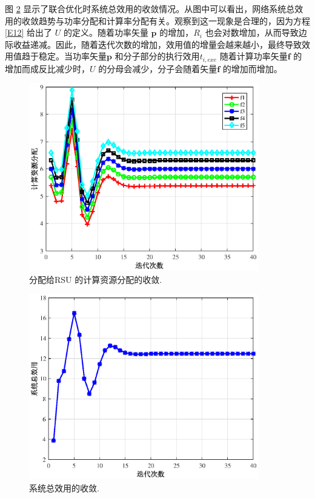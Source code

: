 图 \ref{F4} 显示了联合优化时系统总效用的收敛情况。从图中可以看出，网络系统总效用的收敛趋势与功率分配和计算率分配有关。观察到这一现象是合理的，因为方程 \eqref{E12} 给出了 $U$ 的定义。随着功率矢量 $\mathbf{p}$ 的增加，$R_i$ 也会对数增加，从而导致边际收益递减。因此，随着迭代次数的增加，效用值的增量会越来越小，最终导致效用值趋于稳定。当功率矢量$\mathbf{p}$ 和分子部分的执行效用$t_{i,exe}$ 随着计算功率矢量$\mathbf{f}$ 的增加而成反比减少时，$U$ 的分母会减少，分子会随着矢量$\mathbf{f}$ 的增加而增加。
\begin{figure}[H]
\centering
\includegraphics[width=10cm]{figures//chap3//ff.eps}
\caption{分配给RSU 的计算资源分配的收敛.}
\label{F3}
\end{figure}
\begin{figure}[H]
\centering
\includegraphics[width=10cm]{figures//chap3//ee.eps}
\caption{系统总效用的收敛.}
\label{F4}
\end{figure}

